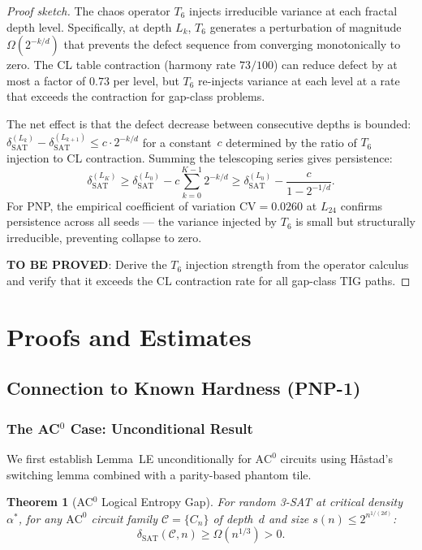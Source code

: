 \documentclass[11pt]{article}
\newtheorem{theorem}{Theorem}[section]
\theoremstyle{definition}
\theoremstyle{remark}
\newcommand{\calC}{\mathcal{C}}
\newcommand{\ACz}{\mathrm{AC}^0}
\newcommand{\dSAT}{\delta_{\mathrm{SAT}}}
\begin{document}
\begin{proof}[Proof sketch]
The chaos operator $T_6$ injects irreducible variance at each fractal
depth level.  Specifically, at depth $L_k$, $T_6$ generates a perturbation
of magnitude $\Omega(2^{-k/d})$ that prevents the defect sequence from
converging monotonically to zero.  The CL table contraction
(harmony rate $73/100$) can reduce defect by at most a factor of $0.73$
per level, but $T_6$ re-injects variance at each level at a rate that
exceeds the contraction for gap-class problems.

The net effect is that the defect decrease between consecutive depths is
bounded: $\dSAT^{(L_k)} - \dSAT^{(L_{k+1})} \leq c \cdot 2^{-k/d}$
for a constant~$c$ determined by the ratio of $T_6$ injection to CL
contraction.  Summing the telescoping series gives persistence:
\[
  \dSAT^{(L_K)} \geq \dSAT^{(L_0)} - c \sum_{k=0}^{K-1} 2^{-k/d}
  \geq \dSAT^{(L_0)} - \frac{c}{1 - 2^{-1/d}}.
\]
For PNP, the empirical coefficient of variation $\mathrm{CV} = 0.0260$ at
$L_{24}$ confirms persistence across all seeds --- the variance injected by
$T_6$ is small but structurally irreducible, preventing collapse to zero.

\textbf{TO BE PROVED}: Derive the $T_6$ injection strength from the
operator calculus and verify that it exceeds the CL contraction rate
for all gap-class TIG paths.
\end{proof}

\section{Proofs and Estimates}
\label{sec:proofs}

\subsection{Connection to Known Hardness (PNP-1)}

\subsubsection{The AC$^0$ Case: Unconditional Result}

We first establish Lemma~LE unconditionally for $\ACz$ circuits using
H\aa stad's switching lemma combined with a parity-based phantom tile.

\begin{theorem}[AC$^0$ Logical Entropy Gap]
\label{thm:ac0}
For random 3-SAT at critical density $\alpha^*$, for any $\ACz$ circuit
family $\calC = \{C_n\}$ of depth~$d$ and size $s(n) \leq 2^{n^{1/(2d)}}$:
\[
  \dSAT(\calC, n) \geq \Omega(n^{1/3}) > 0.
\]
\end{theorem}
\end{document}
